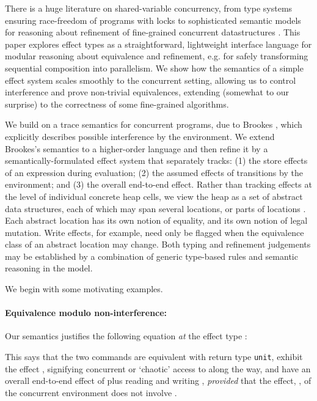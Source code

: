 \documentclass[nocopyrightspace,preprint]{sigplanconf}
\begin{document}
There is a huge literature on shared-variable
concurrency, from type systems ensuring race-freedom of programs with
locks \cite{abadi:typessafelock} to sophisticated semantic models for
reasoning about refinement of fine-grained concurrent datastructures
\cite{dreyer}. This paper explores effect types as a
straightforward, lightweight interface language for modular reasoning
about equivalence and refinement, e.g. for safely transforming
sequential composition into parallelism.  We show how the semantics of
a simple effect system scales smoothly to the concurrent setting,
allowing us to control interference and prove non-trivial
equivalences, extending (somewhat to our surprise) to the correctness
of some fine-grained algorithms.

We build on a trace semantics for concurrent programs, due to Brookes
\cite{brookes96ic}, which explicitly describes possible interference
by the environment. We extend Brookes's semantics to a higher-order
language and then refine it by a semantically-formulated effect system
that separately tracks: (1) the store effects of an expression during
evaluation; (2) the assumed effects of transitions by the environment;
and (3) the overall end-to-end effect.  
Rather than tracking effects at
the level of individual concrete heap cells, we view the heap as a set
of abstract data structures, each of which may span several locations,
or parts of locations \cite{DBLP:dblp_conf/popl/Benton0N14}. Each abstract location has its own notion of
equality, and its own notion of legal mutation. Write effects, for
example, need only be flagged when the equivalence class of an
abstract location may change. Both typing and refinement judgements may be established by a combination of generic type-based rules and semantic reasoning in the model.













\label{examples}
We begin with some motivating examples. 

\paragraph{Equivalence modulo non-interference:}
Our semantics justifies the following equation \emph{at} the  effect type 
:

This says that the two commands are equivalent with return type \texttt{unit}, exhibit the effect , signifying concurrent or `chaotic' access to  along the way, and have an overall end-to-end effect of  plus reading and writing , \emph{provided} that the effect, , of the concurrent environment does not involve .
\nopagebreak
\end{document}
